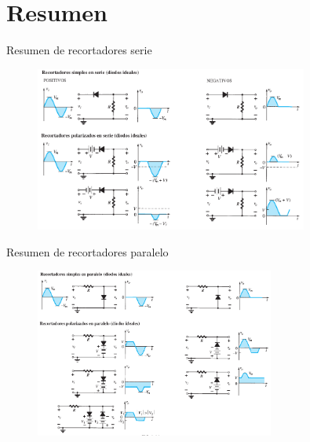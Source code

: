 \documentclass[t,aspectratio=169]{beamer}
\begin{document}
\section{Resumen}
\begin{frame}{Resumen de recortadores serie}

\begin{figure}
    \centering
    \includegraphics[width=0.8\textwidth]{figures/recortador_serie_resumen.png}
\end{figure}

\end{frame}


\begin{frame}{Resumen de recortadores paralelo}

\begin{figure}
    \centering
    \includegraphics[width=0.7\textwidth]{figures/recortador_paralelo_resumen.png}
\end{figure}

\end{frame}
\end{document}
